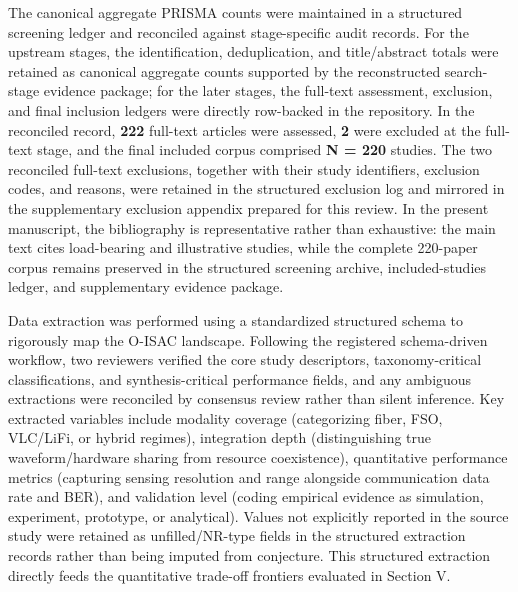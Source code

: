 \documentclass[letterpaper,journal]{IEEEtran}
\begin{document}
The canonical aggregate PRISMA counts were maintained in a structured screening ledger and reconciled against stage-specific audit records. For the upstream stages, the identification, deduplication, and title/abstract totals were retained as canonical aggregate counts supported by the reconstructed search-stage evidence package; for the later stages, the full-text assessment, exclusion, and final inclusion ledgers were directly row-backed in the repository. In the reconciled record, \textbf{222} full-text articles were assessed, \textbf{2} were excluded at the full-text stage, and the final included corpus comprised \textbf{N = 220} studies. The two reconciled full-text exclusions, together with their study identifiers, exclusion codes, and reasons, were retained in the structured exclusion log and mirrored in the supplementary exclusion appendix prepared for this review. In the present manuscript, the bibliography is representative rather than exhaustive: the main text cites load-bearing and illustrative studies, while the complete 220-paper corpus remains preserved in the structured screening archive, included-studies ledger, and supplementary evidence package.

Data extraction was performed using a standardized structured schema to rigorously map the O-ISAC landscape. Following the registered schema-driven workflow, two reviewers verified the core study descriptors, taxonomy-critical classifications, and synthesis-critical performance fields, and any ambiguous extractions were reconciled by consensus review rather than silent inference. Key extracted variables include modality coverage (categorizing fiber, FSO, VLC/LiFi, or hybrid regimes), integration depth (distinguishing true waveform/hardware sharing from resource coexistence), quantitative performance metrics (capturing sensing resolution and range alongside communication data rate and BER), and validation level (coding empirical evidence as simulation, experiment, prototype, or analytical). Values not explicitly reported in the source study were retained as unfilled/NR-type fields in the structured extraction records rather than being imputed from conjecture. This structured extraction directly feeds the quantitative trade-off frontiers evaluated in Section V.
\end{document}

